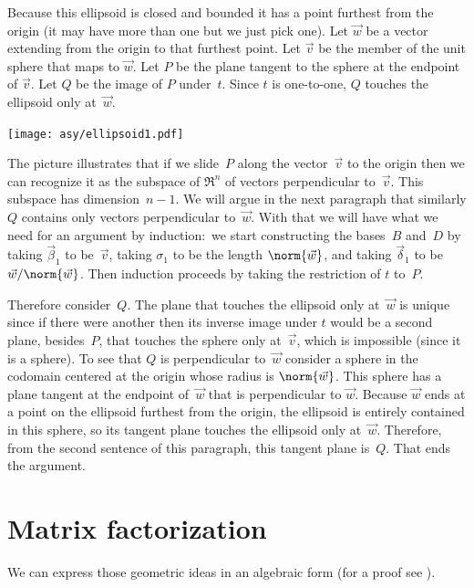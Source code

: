 Because this ellipsoid is closed and bounded it has a 
point furthest from the origin (it may have more than one but we just pick one).
Let $\vec{w}$ be a vector extending from the origin to that furthest point.
Let $\vec{v}$ be the member of the unit sphere that maps to $\vec{w}$.
Let $P$ be the plane tangent to the sphere at the endpoint of $\vec{v}$.
Let $Q$ be the image of $P$ under~$t$.
Since $t$ is one-to-one, $Q$ touches the ellipsoid only at~$\vec{w}$.
\begin{center}
  \texttt{[image: asy/ellipsoid1.pdf]}
\end{center}

The picture illustrates that if we slide~$P$ along the 
vector~$\vec{v}$ to
the origin then we can recognize it as 
the subspace of $\Re^n$ of vectors perpendicular
to~$\vec{v}$.
This subspace has dimension~$n-1$. 
We will argue in the next paragraph 
that similarly $Q$ contains only
vectors perpendicular to~$\vec{w}$.
With that we will have what we need for an argument by induction:~we 
start constructing the 
bases~$B$ and~$D$ by taking $\vec{\beta}_1$ to be~$\vec{v}$, taking
$\sigma_1$ to be the length $\norm{\vec{w}}$, and taking
$\vec{\delta}_1$ to be $\vec{w}/\norm{\vec{w}}$.
Then induction proceeds by taking the restriction of $t$ to~$P$.

Therefore consider~$Q$.
The plane that touches the ellipsoid
only at~$\vec{w}$ is unique since if there were another then its inverse image
under $t$
would be a second plane, besides~$P$, 
that touches the sphere only at~$\vec{v}$, which is impossible (since it is a
sphere).
To see that $Q$ is perpendicular to~$\vec{w}$ consider a sphere in the codomain
centered at the origin whose radius is $\norm{\vec{w}}$.
This sphere has a plane tangent at the endpoint of~$\vec{w}$ 
that is perpendicular
to $\vec{w}$.
Because $\vec{w}$ ends at a point on the ellipsoid furthest from the origin,
the ellipsoid is entirely contained in this sphere, so its tangent plane 
touches the ellipsoid only at~$\vec{w}$.
Therefore, from the second sentence of this paragraph, 
this tangent plane is~$Q$. 
That ends the argument.



\section{Matrix factorization}

We can express those geometric ideas in an algebraic form
(for a proof see \cite{TrefethenBau97}).


